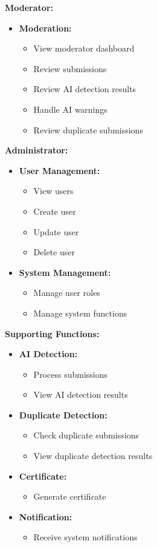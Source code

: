 \textbf{Moderator:}
\begin{itemize}[leftmargin=1.5em, nosep]
    \item \textbf{Moderation:}
    \begin{itemize}[leftmargin=1.5em, nosep]
        \item View moderator dashboard
        \item Review submissions
        \item Review AI detection results
        \item Handle AI warnings
        \item Review duplicate submissions
    \end{itemize}
\end{itemize}

\textbf{Administrator:}
\begin{itemize}[leftmargin=1.5em, nosep]
    \item \textbf{User Management:}
    \begin{itemize}[leftmargin=1.5em, nosep]
        \item View users
        \item Create user
        \item Update user
        \item Delete user
    \end{itemize}
    \item \textbf{System Management:}
    \begin{itemize}[leftmargin=1.5em, nosep]
        \item Manage user roles
        \item Manage system functions
    \end{itemize}
\end{itemize}

\textbf{Supporting Functions:}
\begin{itemize}[leftmargin=1.5em, nosep]
    \item \textbf{AI Detection:}
    \begin{itemize}[leftmargin=1.5em, nosep]
        \item Process submissions
        \item View AI detection results
    \end{itemize}
    \item \textbf{Duplicate Detection:}
    \begin{itemize}[leftmargin=1.5em, nosep]
        \item Check duplicate submissions
        \item View duplicate detection results
    \end{itemize}
    \item \textbf{Certificate:}
    \begin{itemize}[leftmargin=1.5em, nosep]
        \item Generate certificate
    \end{itemize}
    \item \textbf{Notification:}
    \begin{itemize}[leftmargin=1.5em, nosep]
        \item Receive system notifications
    \end{itemize}
\end{itemize}
